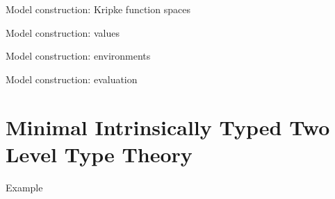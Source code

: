 \documentclass[aspectratio=169]{beamer}
\begin{document}
\begin{frame}{Model construction: Kripke function spaces}




\end{frame}

\begin{frame}{Model construction: values}

  \bigskip

\end{frame}

\begin{frame}{Model construction: environments}

\end{frame}

\begin{frame}{Model construction: evaluation}
  \begin{AgdaSuppressSpace}
  \end{AgdaSuppressSpace}
\end{frame}


\section{Minimal Intrinsically Typed Two Level Type Theory}

\begin{frame}{Example}
\end{frame}
\end{document}
